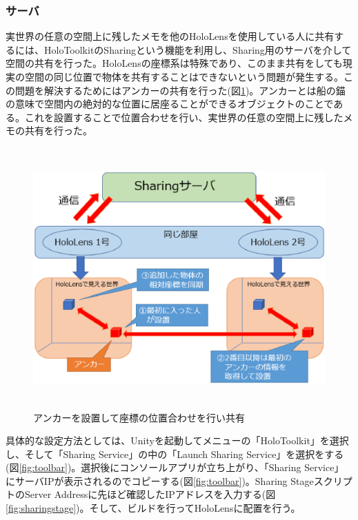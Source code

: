 \documentclass[11pt,a4j, titlepage]{jarticle} %
\begin{document}
\subsubsection{サーバ}
実世界の任意の空間上に残したメモを他のHoloLensを使用している人に共有するには、HoloToolkitのSharing\cite{sharing}という機能を利用し、Sharing用のサーバを介して空間の共有を行った。HoloLensの座標系は特殊であり、このまま共有をしても現実の空間の同じ位置で物体を共有することはできないという問題が発生する。この問題を解決するためにはアンカーの共有を行った(図\ref{fig:sharing})。アンカーとは船の錨の意味で空間内の絶対的な位置に居座ることができるオブジェクトのことである。これを設置することで位置合わせを行い、実世界の任意の空間上に残したメモの共有を行った。

\begin{figure}[H]
  \begin{center}
    \includegraphics[clip,height=10.0cm,width=14.0cm]{./sharing.eps}
    \caption{アンカーを設置して座標の位置合わせを行い共有}
    \label{fig:sharing}
  \end{center}
\end{figure}

具体的な設定方法としては、Unityを起動してメニューの「HoloToolkit」を選択し、そして「Sharing Service」の中の「Launch Sharing Service」を選択をする(図\ref{fig:toolbar})。選択後にコンソールアプリが立ち上がり、「Sharing Service」にサーバIPが表示されるのでコピーする(図\ref{fig:toolbar})。Sharing StageスクリプトのServer Addressに先ほど確認したIPアドレスを入力する(図\ref{fig:sharingstage})。そして、ビルドを行ってHoloLensに配置を行う。
\end{document}
